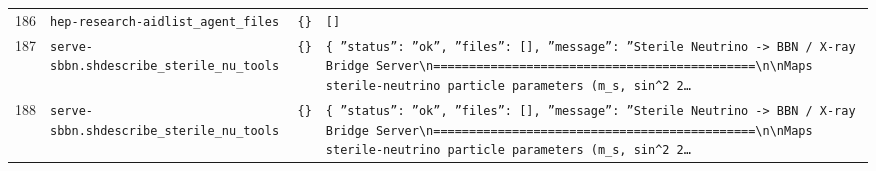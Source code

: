 \documentclass[11pt,a4paper]{article}
\begin{document}
\begin{longtable}{@{}p{}p{}p{}p{}@{}}
186 & \texttt{hep-research-aid}\newline\texttt{list\_\allowbreak{}agent\_\allowbreak{}files} & \texttt{\{\}\allowbreak{}} & \texttt{[]\allowbreak{}} \\
187 & \texttt{serve-sbbn.sh}\newline\texttt{describe\_\allowbreak{}sterile\_\allowbreak{}nu\_\allowbreak{}tools} & \texttt{\{\}\allowbreak{}} & \texttt{\{   ''status'':\allowbreak{} ''ok'',\allowbreak{}   ''files'':\allowbreak{} []\allowbreak{},\allowbreak{}   ''message'':\allowbreak{} ''Sterile Neutrino -\textgreater{}\allowbreak{} BBN /\allowbreak{} X-ray Bridge Server\textbackslash{}\allowbreak{}n=\allowbreak{}=\allowbreak{}=\allowbreak{}=\allowbreak{}=\allowbreak{}=\allowbreak{}=\allowbreak{}=\allowbreak{}=\allowbreak{}=\allowbreak{}=\allowbreak{}=\allowbreak{}=\allowbreak{}=\allowbreak{}=\allowbreak{}=\allowbreak{}=\allowbreak{}=\allowbreak{}=\allowbreak{}=\allowbreak{}=\allowbreak{}=\allowbreak{}=\allowbreak{}=\allowbreak{}=\allowbreak{}=\allowbreak{}=\allowbreak{}=\allowbreak{}=\allowbreak{}=\allowbreak{}=\allowbreak{}=\allowbreak{}=\allowbreak{}=\allowbreak{}=\allowbreak{}=\allowbreak{}=\allowbreak{}=\allowbreak{}=\allowbreak{}=\allowbreak{}=\allowbreak{}=\allowbreak{}=\allowbreak{}=\allowbreak{}=\allowbreak{}\textbackslash{}\allowbreak{}n\textbackslash{}\allowbreak{}nMaps sterile-neutrino particle parameters (m\_\allowbreak{}s,\allowbreak{} sin\textasciicircum{}\allowbreak{}2 2\ldots{}\allowbreak{}} \\
188 & \texttt{serve-sbbn.sh}\newline\texttt{describe\_\allowbreak{}sterile\_\allowbreak{}nu\_\allowbreak{}tools} & \texttt{\{\}\allowbreak{}} & \texttt{\{   ''status'':\allowbreak{} ''ok'',\allowbreak{}   ''files'':\allowbreak{} []\allowbreak{},\allowbreak{}   ''message'':\allowbreak{} ''Sterile Neutrino -\textgreater{}\allowbreak{} BBN /\allowbreak{} X-ray Bridge Server\textbackslash{}\allowbreak{}n=\allowbreak{}=\allowbreak{}=\allowbreak{}=\allowbreak{}=\allowbreak{}=\allowbreak{}=\allowbreak{}=\allowbreak{}=\allowbreak{}=\allowbreak{}=\allowbreak{}=\allowbreak{}=\allowbreak{}=\allowbreak{}=\allowbreak{}=\allowbreak{}=\allowbreak{}=\allowbreak{}=\allowbreak{}=\allowbreak{}=\allowbreak{}=\allowbreak{}=\allowbreak{}=\allowbreak{}=\allowbreak{}=\allowbreak{}=\allowbreak{}=\allowbreak{}=\allowbreak{}=\allowbreak{}=\allowbreak{}=\allowbreak{}=\allowbreak{}=\allowbreak{}=\allowbreak{}=\allowbreak{}=\allowbreak{}=\allowbreak{}=\allowbreak{}=\allowbreak{}=\allowbreak{}=\allowbreak{}=\allowbreak{}=\allowbreak{}=\allowbreak{}\textbackslash{}\allowbreak{}n\textbackslash{}\allowbreak{}nMaps sterile-neutrino particle parameters (m\_\allowbreak{}s,\allowbreak{} sin\textasciicircum{}\allowbreak{}2 2\ldots{}\allowbreak{}} \\

\end{longtable}
\end{document}
